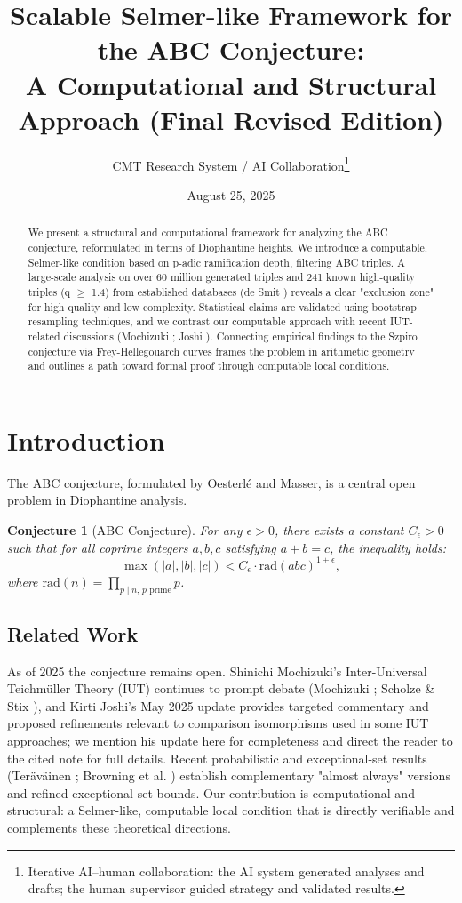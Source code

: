 \documentclass[11pt,a4paper]{article}
\title{Scalable Selmer-like Framework for the ABC Conjecture: \\ A Computational and Structural Approach (Final Revised Edition)}
\author{CMT Research System / AI Collaboration\thanks{Iterative AI--human collaboration: the AI system generated analyses and drafts; the human supervisor guided strategy and validated results.}}
\date{August 25, 2025}
\newtheorem{conjecture}{Conjecture}[section]
\newcommand{\rad}{\mathrm{rad}}
\begin{document}
\maketitle

\begin{abstract}
We present a structural and computational framework for analyzing the ABC conjecture, reformulated in terms of Diophantine heights. We introduce a computable, Selmer-like condition based on p-adic ramification depth, filtering ABC triples. A large-scale analysis on over 60 million generated triples and 241 known high-quality triples (q $\geq$ 1.4) from established databases (de Smit \cite{desmit}) reveals a clear "exclusion zone" for high quality and low complexity. Statistical claims are validated using bootstrap resampling techniques, and we contrast our computable approach with recent IUT-related discussions (Mochizuki \cite{mochizuki2021}; Joshi \cite{joshi2025}). Connecting empirical findings to the Szpiro conjecture via Frey-Hellegouarch curves frames the problem in arithmetic geometry and outlines a path toward formal proof through computable local conditions.
\end{abstract}

\tableofcontents
\bigskip

\section{Introduction}

The ABC conjecture, formulated by Oesterlé and Masser, is a central open problem in Diophantine analysis.

\begin{conjecture}[ABC Conjecture]
For any $\epsilon > 0$, there exists a constant $C_\epsilon > 0$ such that for all coprime integers $a, b, c$ satisfying $a+b=c$, the inequality holds:
\[
    \max(|a|,|b|,|c|) < C_\epsilon \cdot \rad(abc)^{1+\epsilon},
\]
where $\rad(n) = \prod_{p\mid n,\, p \text{ prime}} p$.
\end{conjecture}

\subsection{Related Work}
As of 2025 the conjecture remains open. Shinichi Mochizuki's Inter-Universal Teichmüller Theory (IUT) continues to prompt debate (Mochizuki \cite{mochizuki2021}; Scholze \& Stix \cite{scholze2022}), and Kirti Joshi's May 2025 update \cite{joshi2025} provides targeted commentary and proposed refinements relevant to comparison isomorphisms used in some IUT approaches; we mention his update here for completeness and direct the reader to the cited note for full details. Recent probabilistic and exceptional-set results (Teräväinen \cite{teravainen2025}; Browning et al. \cite{browning2025}) establish complementary "almost always" versions and refined exceptional-set bounds. Our contribution is computational and structural: a Selmer-like, computable local condition that is directly verifiable and complements these theoretical directions.
\end{document}
